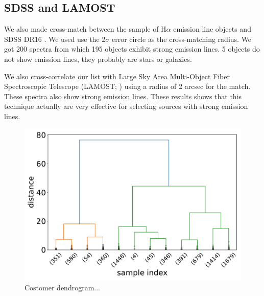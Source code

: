 \documentclass[fleqn,usenatbib]{mnras}
\begin{document}
{\subsection{SDSS and LAMOST}

We also made cross-match between the sample of H{$\alpha$} emission line objects and SDSS DR16
\citep{Ahumada:2020}. We used use the 2$\sigma$ error circle as the cross-matching radius.
We got 200 spectra from which 195 objects exhibit strong emission lines. 5 objects do not show
emission lines, they probably are stars or galaxies.

We also cross-correlate our list with Large Sky Area Multi-Object Fiber Spectroscopic Telescope
(LAMOST; \citealp{Wu:2011}) using a radius of 2 arcsec for the match.  These spectra also
show strong emission lines. These results shows that this technique actually are very effective
for selecting sources with strong emission lines.


\begin{figure}
	\includegraphics[width=0.9\linewidth]{Figs/Customer-Dendrograms.pdf}
    \caption{Costomer dendrogram...}
    \label{fig:dendrogram}
\end{figure}

}
\end{document}
